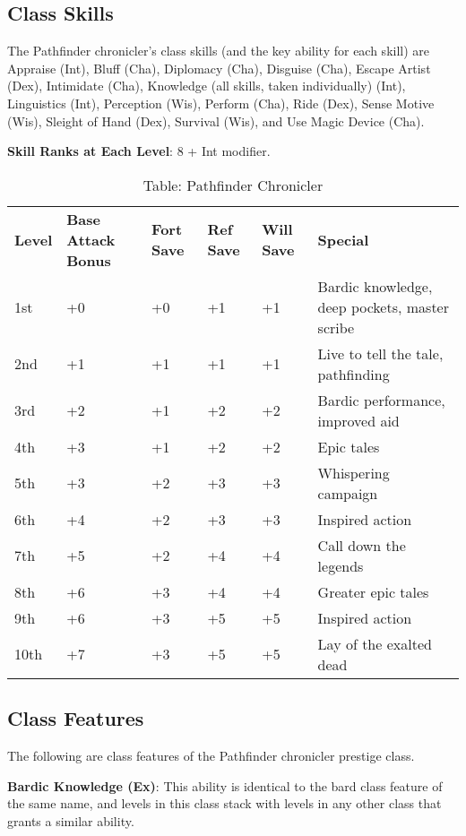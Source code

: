 \subsection{Class Skills}

				
The Pathfinder chronicler's class skills (and the key ability for each skill) are Appraise (Int), Bluff (Cha), Diplomacy (Cha), Disguise (Cha), Escape Artist (Dex), Intimidate (Cha), Knowledge (all skills, taken individually) (Int), Linguistics (Int), Perception (Wis), Perform (Cha), Ride (Dex), Sense Motive (Wis), Sleight of Hand (Dex), Survival (Wis), and Use Magic Device (Cha). 
				
\textbf{ Skill Ranks at Each Level}: 8 + Int modifier.

\begin{table}[]
\sffamily
\caption{Table: Pathfinder Chronicler}
\begin{tabular}{llllll}
\textbf{Level} & \textbf{Base Attack Bonus} & \textbf{Fort Save} & \textbf{Ref Save} & \textbf{Will Save} & \textbf{Special}\\
1st & +0 & +0 & +1 & +1 & Bardic knowledge, deep pockets, master scribe\\
2nd & +1 & +1 & +1 & +1 & Live to tell the tale, pathfinding\\
3rd & +2 & +1 & +2 & +2 & Bardic performance, improved aid\\
4th & +3 & +1 & +2 & +2 & Epic tales\\
5th & +3 & +2 & +3 & +3 & Whispering campaign\\
6th & +4 & +2 & +3 & +3 & Inspired action\\
7th & +5 & +2 & +4 & +4 & Call down the legends\\
8th & +6 & +3 & +4 & +4 & Greater epic tales\\
9th & +6 & +3 & +5 & +5 & Inspired action\\
10th & +7 & +3 & +5 & +5 & Lay of the exalted dead\\
\end{tabular}
\end{table}
				
\subsection{Class Features}

				
The following are class features of the Pathfinder chronicler prestige class.
				
\textbf{Bardic Knowledge (Ex)}: This ability is identical to the bard class feature of the same name, and levels in this class stack with levels in any other class that grants a similar ability. 
				
